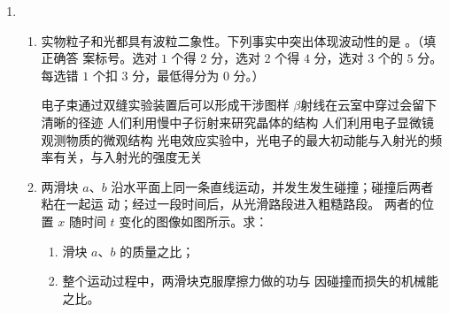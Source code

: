 \begin{enumerate}
\begin{enumerate}




\end{enumerate}



\item
{}
\begin{enumerate}
	\item
实物粒子和光都具有波粒二象性。下列事实中突出体现波动性的是 \underlinegap 。（填正确答
案标号。选对 $ 1 $ 个得 $ 2 $ 分，选对 $ 2 $ 个得 $ 4 $ 分，选对 $ 3 $ 个的 $ 5 $ 分。每选错 $ 1 $ 个扣 $ 3 $ 分，最低得分为 $ 0 $
分。）


\fivechoices
{电子束通过双缝实验装置后可以形成干涉图样}
{$ \beta $射线在云室中穿过会留下清晰的径迹}
{人们利用慢中子衍射来研究晶体的结构}
{人们利用电子显微镜观测物质的微观结构}
{光电效应实验中，光电子的最大初动能与入射光的频率有关，与入射光的强度无关}


 
  
\item 
两滑块 $ a $、$ b $ 沿水平面上同一条直线运动，并发生发生碰撞；碰撞后两者粘在一起运
动；经过一段时间后，从光滑路段进入粗糙路段。
两者的位置 $ x $ 随时间 $ t $ 变化的图像如图所示。求：
\begin{enumerate}
	\item
滑块 $ a $、$ b $ 的质量之比；
\item 
整个运动过程中，两滑块克服摩擦力做的功与
因碰撞而损失的机械能之比。
	
\end{enumerate}
\begin{figure}[h!]
	\flushright
	
\end{figure}





\end{enumerate}
\end{enumerate}
